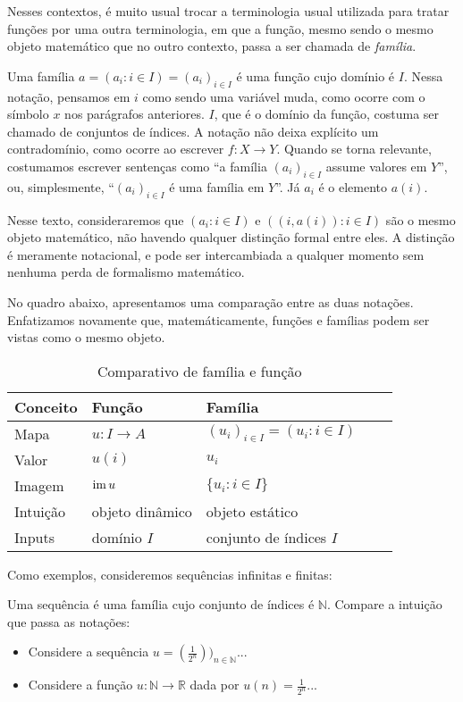 Nesses contextos, é muito usual trocar a terminologia usual utilizada para tratar funções por uma outra terminologia, em que a função, mesmo sendo o mesmo objeto matemático que no outro contexto, passa a ser chamada de \emph{família}.

Uma família $a=(a_i: i \in I)=(a_i)_{i \in I}$ é uma função cujo domínio é $I$.
Nessa notação, pensamos em $i$ como sendo uma variável muda, como ocorre com o símbolo $x$ nos parágrafos anteriores.
$I$, que é o domínio da função, costuma ser chamado de conjuntos de índices.
A notação não deixa explícito um contradomínio, como ocorre ao escrever $f:X\rightarrow Y$.
Quando se torna relevante, costumamos escrever sentenças como ``a família $(a_i)_{i \in I}$ assume valores em $Y$'', ou, simplesmente, ``$(a_i)_{i \in I}$ é uma família em $Y$''.
Já $a_i$ é o elemento $a(i)$.

Nesse texto, consideraremos que $(a_i: i \in I)$ e $((i, a(i)): i \in I)$ são o mesmo objeto matemático, não havendo qualquer distinção formal entre eles.
A distinção é meramente notacional, e pode ser intercambiada a qualquer momento sem nenhuma perda de formalismo matemático.

No quadro abaixo, apresentamos uma comparação entre as duas notações.
Enfatizamos novamente que, matemáticamente, funções e famílias podem ser vistas como o mesmo objeto.
\begin{table}[h]
    \centering
    \begin{tabular}{lllll}
        \hline
        \textbf{Conceito} & \textbf{Função} & \textbf{Família} \\ \hline
        Mapa & $u:I\rightarrow A$ & $(u_i)_{i \in I}=(u_i: i \in I)$ \\
        Valor & $u(i)$ & $u_i$ \\
        Imagem & $\operatorname{im} u$ & $\{u_i: i \in I\}$\\
        Intuição & objeto dinâmico & objeto estático \\
        Inputs & domínio $I$ & conjunto de índices $I$ \\
        \hline
    \end{tabular}
    \caption{Comparativo de família e função}
\end{table}

Como exemplos, consideremos sequências infinitas e finitas:

\begin{exemplo}[Sequências]
    Uma sequência é uma família cujo conjunto de índices é $\mathbb N$.
    Compare a intuição que passa as notações:
    \begin{itemize}
    \item Considere a sequência $u=(\frac{1}{2^n}))_{n \in \mathbb N}$...
    \item Considere a função $u:\mathbb N\rightarrow \mathbb R$ dada por $u(n)=\frac{1}{2^n}$...
    \end{itemize}
    

\end{exemplo}

